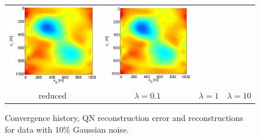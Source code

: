 \documentclass{iopart}
\begin{document}
\begin{figure}
\begin{tabular}{cccc}
\includegraphics[scale=.2]{./figs/2D_exp3_g}&
\includegraphics[scale=.2]{./figs/2D_exp3_h}\\
{\small reduced}&{\small $\lambda=0.1$}&{\small $\lambda=1$}&{\small $\lambda=10$}\\
\end{tabular}
\caption{Convergence history, QN reconstruction error and reconstructions for data with 10\% Gaussian noise.}
\label{fig:2D_exp3}
\end{figure}
\end{document}
